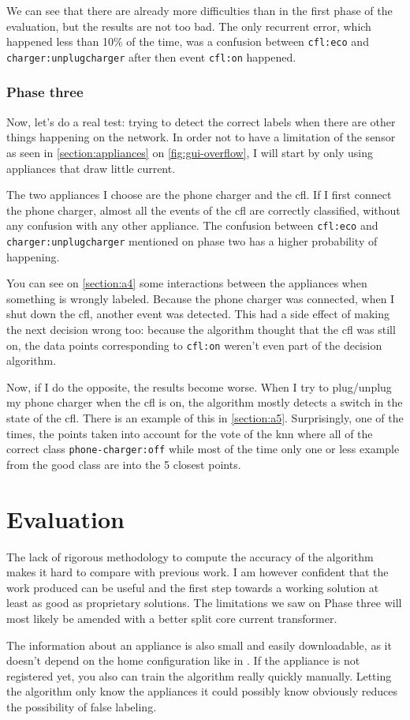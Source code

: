 We can see that there are already more difficulties than in the first phase of the evaluation, but the results are not too bad. The only recurrent error, which happened less than 10\% of the time, was a confusion between \texttt{cfl:eco} and \texttt{charger:unplugcharger} after then event \texttt{cfl:on} happened.

\subsubsection{Phase three}
Now, let's do a real test: trying to detect the correct labels when there are other things happening on the network. In order not to have a limitation of the sensor as seen in \autoref{section:appliances} on \autoref{fig:gui-overflow}, I will start by only using appliances that draw little current.

The two appliances I choose are the phone charger and the \acrshort{cfl}. If I first connect the phone charger, almost all the events of the \acrshort{cfl} are correctly classified, without any confusion with any other appliance. The confusion between \texttt{cfl:eco} and \texttt{charger:unplugcharger} mentioned on phase two has a higher probability of happening.

You can see on \autoref{section:a4} some interactions between the appliances when something is wrongly labeled. Because the phone charger was connected, when I shut down the \acrshort{cfl}, another event was detected. This had a side effect of making the next decision wrong too: because the algorithm thought that the \acrshort{cfl} was still on, the data points corresponding to \texttt{cfl:on} weren't even part of the decision algorithm.

Now, if I do the opposite, the results become worse. When I try to plug/unplug my phone charger when the \acrshort{cfl} is on, the algorithm mostly detects a switch in the state of the \acrshort{cfl}. There is an example of this in \autoref{section:a5}. Surprisingly, one of the times, the points taken into account for the vote of the \acrshort{knn} where all of the correct class \texttt{phone-charger:off} while most of the time only one or less example from the good class are into the 5 closest points.

\section{Evaluation}
\cite{makonin2015nonintrusive}
The lack of rigorous methodology to compute the accuracy of the algorithm makes it hard to compare with previous work. I am however confident that the work produced can be useful and the first step towards a working solution at least as good as proprietary solutions. The limitations we saw on Phase three will most likely be amended with a better split core current transformer.

The information about an appliance is also small and easily downloadable, as it doesn't depend on the home configuration like in \cite{gupta2010electrisense}. If the appliance is not registered yet, you also can train the algorithm really quickly manually. Letting the algorithm only know the appliances it could possibly know obviously reduces the possibility of false labeling.